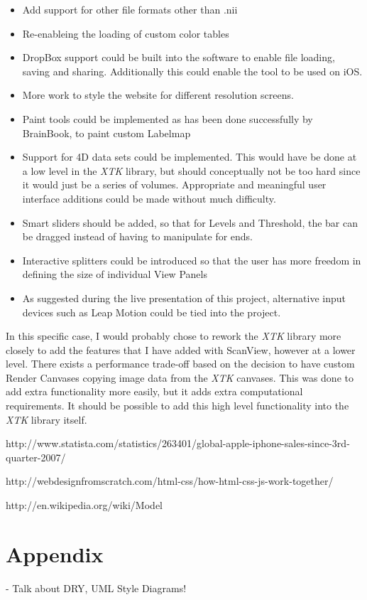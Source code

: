 \documentclass[a4paper,11pt,twoside]{article}
\begin{document}
\begin{itemize}
\item Add support for other file formats other than .nii
\item Re-enableing the loading of custom color tables
\item DropBox support could be built into the software to enable file loading, saving and sharing. Additionally this could enable the tool to be used on iOS.
\item More work to style the website for different resolution screens.
\item Paint tools could be implemented as has been done successfully by BrainBook, to paint custom Labelmap
\item Support for 4D data sets could be implemented. This would have be done at a low level in the \textit{XTK} library, but should conceptually not be too hard since it would just be a series of volumes. Appropriate and meaningful user interface additions could be made without much difficulty.
\item Smart sliders should be added, so that for Levels and Threshold, the bar can be dragged instead of having to manipulate for ends.
\item Interactive splitters could be introduced so that the user has more freedom in defining the size of individual View Panels
\item As suggested during the live presentation of this project, alternative input devices such as Leap Motion could be tied into the project.
\end{itemize}


In this specific case, I would probably chose to rework the \textit{XTK} library more closely to add the features that I have added with ScanView, however at a lower level. There exists a performance trade-off based on the decision to have custom Render Canvases copying image data from the \textit{XTK} canvases. This was done to add extra functionality more easily, but it adds extra computational requirements. It should be possible to add this high level functionality into the \textit{XTK} library itself.










\newpage

\begin{thebibliography}{1}


http://www.statista.com/statistics/263401/global-apple-iphone-sales-since-3rd-quarter-2007/

http://webdesignfromscratch.com/html-css/how-html-css-js-work-together/

http://en.wikipedia.org/wiki/Model%

\end{thebibliography}

\newpage

\section{Appendix}



- Talk about DRY, UML Style Diagrams!
\end{document}
